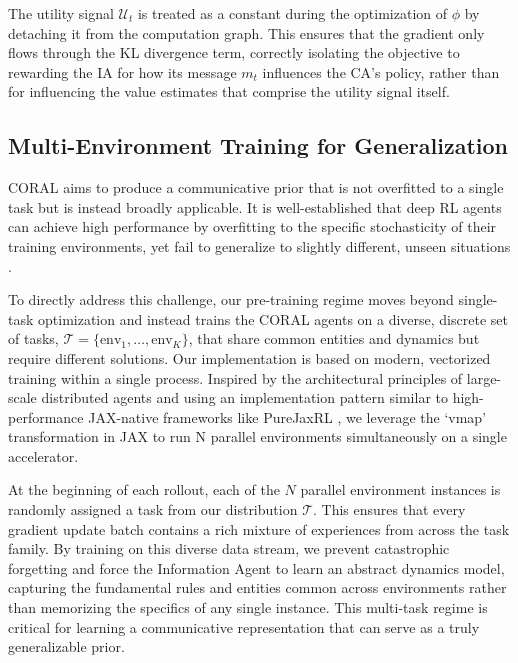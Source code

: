 \documentclass[letterpaper]{article} %
\begin{document}

The utility signal $\mathcal{U}_t$ is treated as a constant during the optimization of $\phi$ by detaching it from the computation graph. This ensures that the gradient only flows through the KL divergence term, correctly isolating the objective to rewarding the IA for how its message $m_t$ influences the CA's policy, rather than for influencing the value estimates that comprise the utility signal itself.

\subsection{Multi-Environment Training for Generalization}
CORAL aims to produce a communicative prior that is not overfitted to a single task but is instead broadly applicable. It is well-established that deep RL agents can achieve high performance by overfitting to the specific stochasticity of their training environments, yet fail to generalize to slightly different, unseen situations \cite{cobbe2020leveraging}.

To directly address this challenge, our pre-training regime moves beyond single-task optimization and instead trains the CORAL agents on a diverse, discrete set of tasks, $\mathcal{T} = \{\text{env}_1, \ldots, \text{env}_K\}$, that share common entities and dynamics but require different solutions. Our implementation is based on modern, vectorized training within a single process. Inspired by the architectural principles of large-scale distributed agents \cite{espeholt2018impala} and using an implementation pattern similar to high-performance JAX-native frameworks like PureJaxRL \cite{lu2022discovered}, we leverage the `vmap' transformation in JAX \cite{jax2018github} to run N parallel environments simultaneously on a single accelerator.

At the beginning of each rollout, each of the $N$ parallel environment instances is randomly assigned a task from our distribution $\mathcal{T}$. This ensures that every gradient update batch contains a rich mixture of experiences from across the task family. By training on this diverse data stream, we prevent catastrophic forgetting and force the Information Agent to learn an abstract dynamics model, capturing the fundamental rules and entities common across environments rather than memorizing the specifics of any single instance. This multi-task regime is critical for learning a communicative representation that can serve as a truly generalizable prior.
\end{document}
